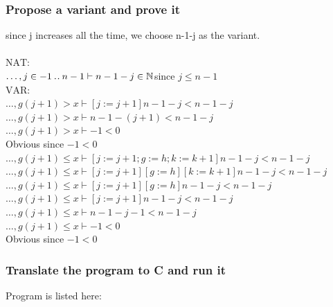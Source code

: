 \documentclass[11pt,a4paper,fleqn]{article}
\begin{document}
\subsubsection{Propose a variant and prove it}
\noindent
since j increases all the time, we choose n-1-j as the variant.\\ 
\\
$\text{NAT:}$\\
$ \ldots,j\in -1\mathbin{.\mkern1mu.} n-1\vdash n-1-j\in \mathbb{N}$\quad since $j\leq n-1$\\
$\text{VAR:}$\\
$ \ldots,g(j+1)>x\vdash[j:=j+1]n-1-j<n-1-j$\\
$ \ldots,g(j+1)>x\vdash n-1-(j+1)<n-1-j$\\
$ \ldots,g(j+1)>x\vdash -1<0$\\
Obvious since $-1<0$\\
$ \ldots,g(j+1)\leq x\vdash[j:=j+1;g:=h;k:=k+1]n-1-j<n-1-j$\\
$ \ldots,g(j+1)\leq x\vdash[j:=j+1][g:=h][k:=k+1]n-1-j<n-1-j$\\
$ \ldots,g(j+1)\leq x\vdash[j:=j+1][g:=h]n-1-j<n-1-j$\\
$ \ldots,g(j+1)\leq x\vdash[j:=j+1]n-1-j<n-1-j$\\
$ \ldots,g(j+1)\leq x\vdash n-1-j-1<n-1-j$\\
$ \ldots,g(j+1)\leq x\vdash -1<0$\\
Obvious since $-1<0$\\

\subsubsection{Translate the program to C and run it}
Program is listed here:\\
\end{document}
